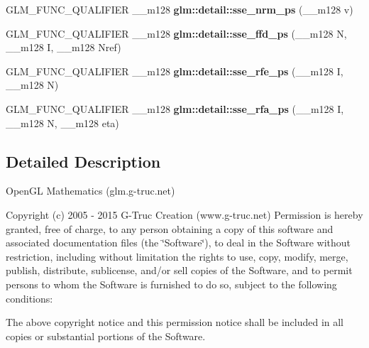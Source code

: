 \begin{DoxyCompactItemize}
\item 
\hypertarget{namespaceglm_1_1detail_a9f1826e935d79fc46faaf70499cba320}{G\-L\-M\-\_\-\-F\-U\-N\-C\-\_\-\-Q\-U\-A\-L\-I\-F\-I\-E\-R \-\_\-\-\_\-m128 {\bfseries glm\-::detail\-::sse\-\_\-nrm\-\_\-ps} (\-\_\-\-\_\-m128 v)}\label{namespaceglm_1_1detail_a9f1826e935d79fc46faaf70499cba320}

\item 
\hypertarget{namespaceglm_1_1detail_ace9256f388e836f9411a6eb92bed1a8a}{G\-L\-M\-\_\-\-F\-U\-N\-C\-\_\-\-Q\-U\-A\-L\-I\-F\-I\-E\-R \-\_\-\-\_\-m128 {\bfseries glm\-::detail\-::sse\-\_\-ffd\-\_\-ps} (\-\_\-\-\_\-m128 N, \-\_\-\-\_\-m128 I, \-\_\-\-\_\-m128 Nref)}\label{namespaceglm_1_1detail_ace9256f388e836f9411a6eb92bed1a8a}

\item 
\hypertarget{namespaceglm_1_1detail_a48dc48d40e141bd2fff6b9c88b7e05e4}{G\-L\-M\-\_\-\-F\-U\-N\-C\-\_\-\-Q\-U\-A\-L\-I\-F\-I\-E\-R \-\_\-\-\_\-m128 {\bfseries glm\-::detail\-::sse\-\_\-rfe\-\_\-ps} (\-\_\-\-\_\-m128 I, \-\_\-\-\_\-m128 N)}\label{namespaceglm_1_1detail_a48dc48d40e141bd2fff6b9c88b7e05e4}

\item 
\hypertarget{namespaceglm_1_1detail_a5086fa9f09dcfec333b9eebeae468767}{G\-L\-M\-\_\-\-F\-U\-N\-C\-\_\-\-Q\-U\-A\-L\-I\-F\-I\-E\-R \-\_\-\-\_\-m128 {\bfseries glm\-::detail\-::sse\-\_\-rfa\-\_\-ps} (\-\_\-\-\_\-m128 I, \-\_\-\-\_\-m128 N, \-\_\-\-\_\-m128 eta)}\label{namespaceglm_1_1detail_a5086fa9f09dcfec333b9eebeae468767}

\end{DoxyCompactItemize}


\subsection{Detailed Description}
Open\-G\-L Mathematics (glm.\-g-\/truc.\-net)

Copyright (c) 2005 -\/ 2015 G-\/\-Truc Creation (www.\-g-\/truc.\-net) Permission is hereby granted, free of charge, to any person obtaining a copy of this software and associated documentation files (the \char`\"{}\-Software\char`\"{}), to deal in the Software without restriction, including without limitation the rights to use, copy, modify, merge, publish, distribute, sublicense, and/or sell copies of the Software, and to permit persons to whom the Software is furnished to do so, subject to the following conditions\-:

The above copyright notice and this permission notice shall be included in all copies or substantial portions of the Software.

